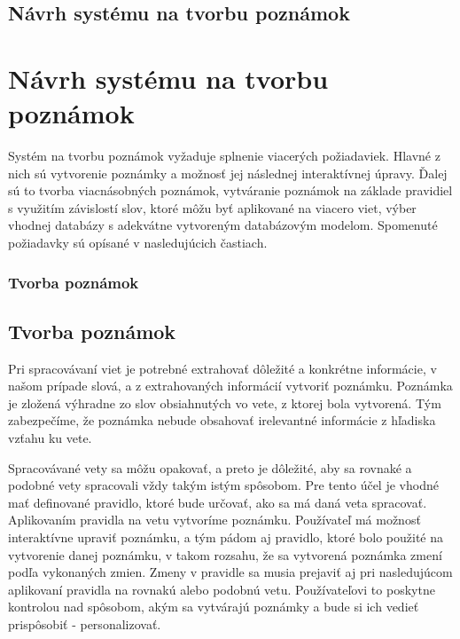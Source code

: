 \newpage
%
%
{
	\section{Návrh systému na tvorbu poznámok}
}
{
	\chapter{Návrh systému na tvorbu poznámok}
}
\label{design}
Systém na tvorbu poznámok vyžaduje splnenie viacerých požiadaviek. Hlavné z nich sú vytvorenie poznámky a možnosť jej následnej interaktívnej úpravy. Ďalej sú to tvorba viacnásobných poznámok, vytváranie poznámok na základe pravidiel s využitím závislostí slov, ktoré môžu byť aplikované na viacero viet, výber vhodnej databázy s adekvátne vytvoreným databázovým modelom. Spomenuté požiadavky sú opísané v nasledujúcich častiach.

%
%
{
	\subsection{Tvorba poznámok}
}
{
	\section{Tvorba poznámok}
}
\label{subsection:notes_creation}
Pri spracovávaní viet je potrebné extrahovať dôležité a konkrétne informácie, v našom prípade slová, a z extrahovaných informácií vytvoriť poznámku. Poznámka je zložená výhradne zo slov obsiahnutých vo vete, z ktorej bola vytvorená. Tým zabezpečíme, že poznámka nebude obsahovať irelevantné informácie z hľadiska vzťahu ku vete. 

Spracovávané vety sa môžu opakovať, a preto je dôležité, aby sa rovnaké a podobné vety spracovali vždy takým istým spôsobom. Pre tento účel je vhodné mať definované pravidlo, ktoré bude určovať, ako sa má daná veta spracovať. Aplikovaním pravidla na vetu vytvoríme poznámku. Používateľ má možnosť interaktívne upraviť poznámku, a tým pádom aj pravidlo, ktoré bolo použité na vytvorenie danej poznámku, v takom rozsahu, že sa vytvorená poznámka zmení podľa vykonaných zmien. Zmeny v pravidle sa musia prejaviť aj pri nasledujúcom aplikovaní pravidla na rovnakú alebo podobnú vetu. Používateľovi to poskytne kontrolou nad spôsobom, akým sa vytvárajú poznámky a bude si ich vedieť prispôsobiť - personalizovať.

